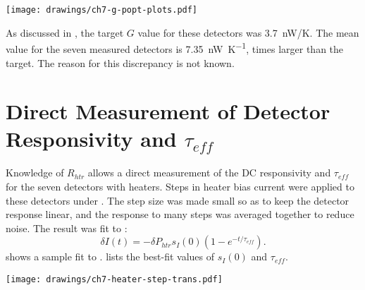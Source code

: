 \begin{figure*}
\texttt{[image: drawings/ch7-g-popt-plots.pdf]}
\caption[Impact of different $P_{opt}$ assumptions]{
Plots showing effect of $P_{opt}$ assumptions on $G$ and $T_c$ measurements.
\textbf{Left} Plot showing variation of $G$ for  vs assumed value of $P_{opt}$.
The statistical uncertainty in $G$ for this detector is approximately the same as the systematic uncertainty that results from the estimation of $P_{opt}$.
\textbf{Right} Plot showing variation of $T_c$ for  vs assumed value of $P_{opt}$.
In this case the systematic uncertainty is larger than the statistical uncertainty, although the change is only \SI{2.2}{\percent} as $P_{opt}$ increases from \SI{100}{\pW} to \SI{300}{\pW}.
The value of $n$ shows no trend with $P_{opt}$.
} 
\label{fig:heater-g-popt-plots}
\end{figure*}

As discussed in , the target $G$ value for these detectors was 3.7~nW/K.
The mean value for the seven measured detectors is \SI{7.35}{\nano\watt\per\kelvin},  times larger than the target.
The reason for this discrepancy is not known.

\section{Direct Measurement of Detector Responsivity and $\tau_{eff}$} \label{sec:teff-resp}

Knowledge of $R_{htr}$ allows a direct measurement of the DC responsivity and $\tau_{eff}$ for the seven detectors with heaters.
Steps in heater bias current were applied to these detectors under \SOC.
The step size was made small so as to keep the detector response linear, and the response to many steps was averaged together to reduce noise.
The result was fit to :
\begin{equation} \label{eqn:ch7-heater-step-trans}
  \delta I(t) = - \delta P_{htr} s_I(0) (1 - e^{-t/\tau_{eff}}).
\end{equation}
 shows a sample fit to .
 lists the best-fit values of $s_I(0)$ and $\tau_{eff}$.

\begin{figure*}
\centering
\texttt{[image: drawings/ch7-heater-step-trans.pdf]}
\caption[Detector response to heater steps]{
Plot showing response of detector  to step in applied heater power of \SI{1.41}{\pico\watt}.
Plots are for  biased into \SOC.
Data acquired at \SI{3125}{\Hz}.
The data averaged over 32 steps (16 up and 16 down), along with best fit to , are plotted.
The step in applied power begins at $t \approx \SI{0.6}{\ms}$, not $t = \SI{0}{\ms}$.
} 
\label{fig:ch7-heater-step-trans}
\end{figure*}

